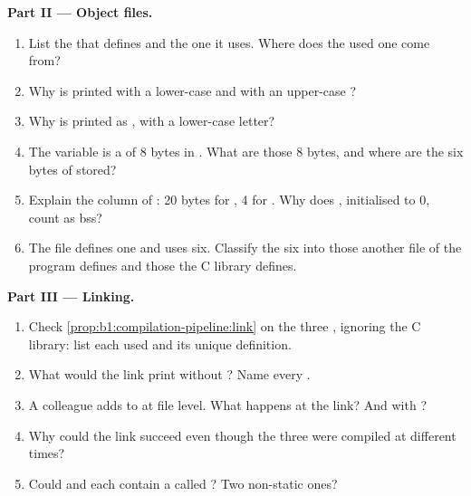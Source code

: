 \begin{problem}
\medskip\noindent\textbf{Part II --- Object files.}
\begin{enumerate}[resume]
\item List the  that  defines and the one it uses. Where does the used one come from?
\item Why is  printed with a lower-case  and  with an upper-case ?
\item Why is  printed as , with a lower-case letter?
\item The variable  is a   of 8 bytes in . What are those 8 bytes, and
where are the six bytes of  stored?
\item Explain the  column of : 20 bytes for , 4 for . Why does
, initialised to 0, count as bss?
\item The file  defines one  and uses six. Classify the six into those another file of the
program defines and those the C library defines.
\end{enumerate}

\medskip\noindent\textbf{Part III --- Linking.}
\begin{enumerate}[resume]
\item Check \cref{prop:b1:compilation-pipeline:link} on the three , ignoring the C library: list
each used  and its unique definition.
\item What would the link print without ? Name every .
\item A colleague adds  to  at file level. What happens at the link? And with
?
\item Why could the link succeed even though the three  were compiled at different times?
\item Could  and  each contain a  called ? Two
non-static ones?
\end{enumerate}


\end{problem}
